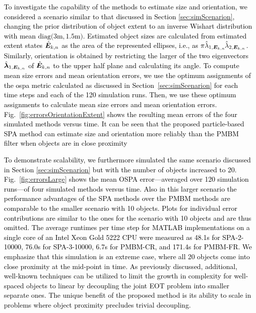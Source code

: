 \documentclass[10pt, twoside, romanappendices]{IEEEtran}
\providecommand{\rd}{\textcolor{black}}
\providecommand{\rmv}{\hspace*{-.3mm}}
\begin{document}
\rd{To investigate the capability of the methods to estimate size and orientation, we considered a scenario similar to that discussed in Section \ref{sec:simScenarion}, changing the prior distribution of object extent to an inverse Wishart distribution with mean $\mathrm{diag}\big(3 \text{m}, 1.5 \text{m} \big)$. Estimated object sizes are calculated from estimated extent states $\hat{\M{E}}_{k,n}$ as the area of the represented ellipses, i.e., as $\pi \hat{\lambda}_{1,\M{E}_{k,n}} \rmv \hat{\lambda}_{2,\M{E}_{k,n}}$. Similarly, orientation is obtained by restricting the larger of the two eigenvectors $ \hat{\V{\lambda}}_{1,\M{E}_{k,n}}$ of $\hat{\M{E}}_{k,n}$ to the upper half plane and calculating its angle. To compute mean size errors and mean orientation errors, we use the optimum assignments of the \ac{ospa} \cite{SchVoVo:J08} metric  calculated as discussed in Section~\ref{sec:simScenarion} for each time steps and each of the 120 simulation runs. Then, we use these optimum assignments to calculate mean size errors and mean orientation errors. Fig.\ \ref{fig:errorsOrientationExtent} shows the resulting mean errors of the four simulated methods versus time. It can be seen that the proposed particle-based SPA method can estimate size and orientation more reliably than the PMBM filter when objects are in close proximity}

  
\rd{To demonstrate scalability, we furthermore simulated the same scenario discussed in Section \ref{sec:simScenarion} but with the number of objects increased to 20. Fig.\ \ref{fig:errorsLarge} shows the mean OSPA error---averaged over 120 simulation runs---of four simulated methods versus time. Also in this larger scenario the performance advantages of the SPA methods over the PMBM methods are comparable to the smaller scenario with 10 objects. Plots for individual error contributions are similar to the ones for the scenario with 10 objects and are thus omitted. The average runtimes per time step for MATLAB implementations on a single core of an Intel Xeon Gold 5222 CPU were measured as 48.1s for SPA-2-10000, 76.0s for SPA-3-10000, 6.7s for PMBM-CR, and 171.4s for PMBM-FR. We emphasize that this simulation is an extreme case, where all 20 objects come into close proximity at the mid-point in time. As previously discussed, additional, well-known  techniques can be utilized to limit the growth in complexity for well-spaced objects to linear by decoupling the joint EOT problem into smaller separate ones. The unique benefit of the proposed method is its ability to scale in problems where object proximity precludes trivial \vspace{-1mm} decoupling.}
   
\end{document}
